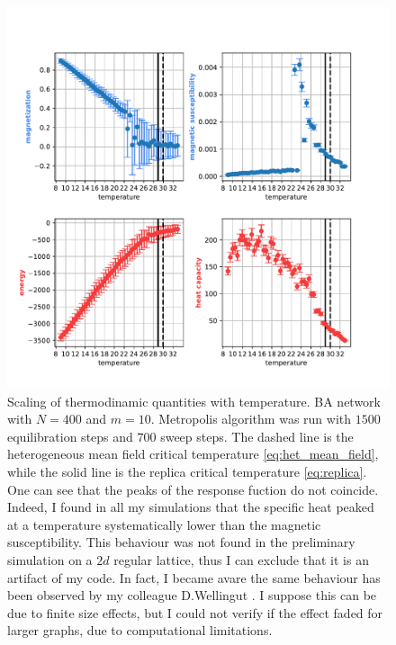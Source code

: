 \begin{figure}
    \centering
    \includegraphics[width=\linewidth]{latex_source/images/ising/BA_scaling_num_nodes_400_t_points_50_steps_700_m_10_ti_8.99_tf_32.95.pdf}
    \caption{Scaling of thermodinamic quantities with temperature. BA network with $N=400$ and $m=10$. Metropolis algorithm was run with $1500$ equilibration steps and $700$ sweep steps. The dashed line is the heterogeneous mean field critical temperature \ref{eq:het_mean_field}, while the solid line is the replica critical temperature \ref{eq:replica}. One can see that the peaks of the response fuction do not coincide. Indeed, I found in all my simulations that the specific heat peaked at a temperature systematically lower than the magnetic susceptibility. This behaviour was not found in the preliminary simulation on a $2d$ regular lattice, thus I can exclude that it is an artifact of my code. In fact, I became avare the same behaviour has been observed by my colleague D.Wellingut \cite{dw}. I suppose this can be due to finite size effects, but I could not verify if the effect faded for larger graphs, due to computational limitations.}
    \label{fig:BA_scaling_m_10}
\end{figure}
